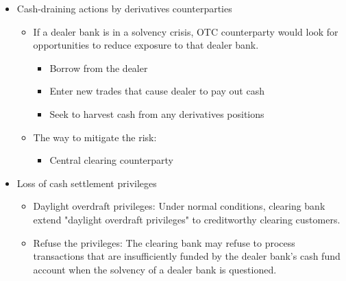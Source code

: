 \begin{itemize}
\begin{itemize}
    \item Clients' balances: The prime broker can use clients' cash balances to meet the immediate cash demands of another.
    \item Rehypothecation: Margin loans for a dealer bank can also be financed using the client's own assets as collateral, through "rehypothecation."
    \item Clients' departures: If clients do leave without notice, their cash and securities are not in the pool, forcing dealer banks to use its own cash to meet liquidity needs.
    \end{itemize}
\item Cash-draining actions by derivatives counterparties
    \begin{itemize}
    \item If a dealer bank is in a solvency crisis, OTC counterparty would look for opportunities to reduce exposure to that dealer bank.
        \begin{itemize}
        \item Borrow from the dealer
        \item Enter new trades that cause dealer to pay out cash
        \item Seek to harvest cash from any derivatives positions
        \end{itemize}
    \item The way to mitigate the risk:
        \begin{itemize}
        \item Central clearing counterparty
        \end{itemize}
    \end{itemize}
\item Loss of cash settlement privileges
    \begin{itemize}
    \item Daylight overdraft privileges: Under normal conditions, clearing bank extend "daylight overdraft privileges" to creditworthy clearing customers.
    \item Refuse the privileges: The clearing bank may refuse to process transactions that are insufficiently funded by the dealer bank's cash fund account when the solvency of a dealer bank is questioned.
    \end{itemize}
\end{itemize}



